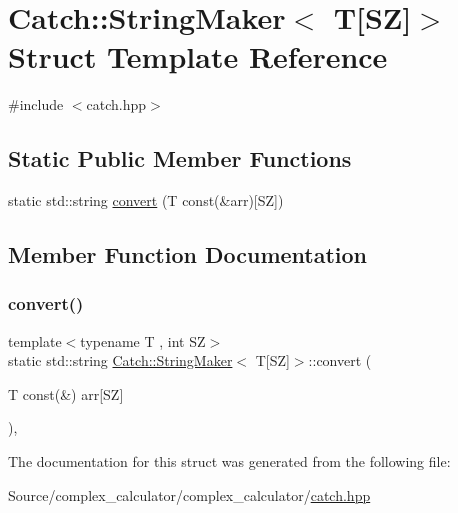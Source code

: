 \hypertarget{struct_catch_1_1_string_maker_3_01_t[_s_z]_4}{}\section{Catch\+:\+:String\+Maker$<$ T\mbox{[}SZ\mbox{]}$>$ Struct Template Reference}
\label{struct_catch_1_1_string_maker_3_01_t[_s_z]_4}


{\ttfamily \#include $<$catch.\+hpp$>$}

\subsection*{Static Public Member Functions}
\begin{DoxyCompactItemize}
\item 
static std\+::string \mbox{\hyperlink{struct_catch_1_1_string_maker_3_01_t[_s_z]_4_a3698cea2c24d8649ec9ecb5fa679eeb7}{convert}} (T const(\&arr)\mbox{[}SZ\mbox{]})
\end{DoxyCompactItemize}


\subsection{Member Function Documentation}
\mbox{\label{struct_catch_1_1_string_maker_3_01_t[_s_z]_4_a3698cea2c24d8649ec9ecb5fa679eeb7}} 
\subsubsection{\texorpdfstring{convert()}{convert()}}
{\footnotesize\ttfamily template$<$typename T , int SZ$>$ \\
static std\+::string \mbox{\hyperlink{struct_catch_1_1_string_maker}{Catch\+::\+String\+Maker}}$<$ T\mbox{[}SZ\mbox{]}$>$\+::convert (\begin{DoxyParamCaption}\item[{T const(\&)}]{arr\mbox{[}\+S\+Z\mbox{]} }\end{DoxyParamCaption})\hspace{0.3cm}{\ttfamily [inline]}, {\ttfamily [static]}}



The documentation for this struct was generated from the following file\+:\begin{DoxyCompactItemize}
\item 
Source/complex\+\_\+calculator/complex\+\_\+calculator/\mbox{\hyperlink{catch_8hpp}{catch.\+hpp}}\end{DoxyCompactItemize}

